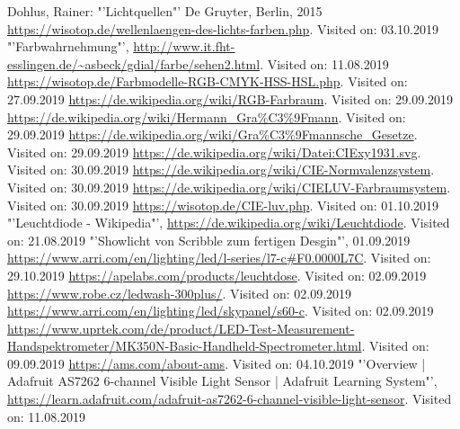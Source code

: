 \documentclass[11pt]{scrartcl}
\begin{document}
\begin{thebibliography}{xxxxxxxxxxxxxxxxxxx}
     Dohlus, Rainer: "'Lichtquellen"' De Gruyter, Berlin, 2015
     \url{https://wisotop.de/wellenlaengen-des-lichts-farben.php}. Visited on: 03.10.2019
    "'Farbwahrnehmung"', \url{http://www.it.fht-esslingen.de/~asbeck/gdial/farbe/sehen2.html}. Visited on: 11.08.2019
     \url{https://wisotop.de/Farbmodelle-RGB-CMYK-HSS-HSL.php}. Visited on: 27.09.2019
     \url{https://de.wikipedia.org/wiki/RGB-Farbraum}. Visited on: 29.09.2019
     \url{https://de.wikipedia.org/wiki/Hermann\_Gra%C3%9Fmann}. Visited on: 29.09.2019
     \url{https://de.wikipedia.org/wiki/Gra%C3%9Fmannsche_Gesetze}. Visited on: 29.09.2019
     \url{https://de.wikipedia.org/wiki/Datei:CIExy1931.svg}. Visited on: 30.09.2019
     \url{https://de.wikipedia.org/wiki/CIE-Normvalenzsystem}. Visited on: 30.09.2019
     \url{https://de.wikipedia.org/wiki/CIELUV-Farbraumsystem}. Visited on: 30.09.2019
     \url{https://wisotop.de/CIE-luv.php}. Visited on: 01.10.2019
    "'Leuchtdiode - Wikipedia"', \url{https://de.wikipedia.org/wiki/Leuchtdiode}. Visited on: 21.08.2019
    "'Showlicht von Scribble zum fertigen Desgin"', 01.09.2019
     \url{https://www.arri.com/en/lighting/led/l-series/l7-c#F0.0000L7C}. Visited on: 29.10.2019
     \url{https://apelabs.com/products/leuchtdose}. Visited on: 02.09.2019
     \url{https://www.robe.cz/ledwash-300plus/}. Visited on: 02.09.2019
     \url{https://www.arri.com/en/lighting/led/skypanel/s60-c}. Visited on: 02.09.2019
     \url{https://www.uprtek.com/de/product/LED-Test-Measurement-Handspektrometer/MK350N-Basic-Handheld-Spectrometer.html}. Visited on: 09.09.2019
     \url{https://ams.com/about-ams}. Visited on: 04.10.2019
    "'Overview | Adafruit AS7262 6-channel Visible Light Sensor | Adafruit Learning System"', \url{https://learn.adafruit.com/adafruit-as7262-6-channel-visible-light-sensor}. Visited on: 11.08.2019

\end{thebibliography}
\end{document}
